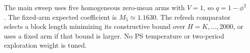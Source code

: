 \documentclass[11pt]{article}
\begin{document}
The main sweep uses five homogeneous zero-mean arms with $V=1$, so $q=1-\phi^2$. The fixed-arm expected coefficient is $M_5\simeq1.1630$. The refresh comparator selects a block length minimizing its constructive bound over $H=K,\ldots,2000$, or uses a fixed arm if that bound is larger. No PS temperature or two-period exploration weight is tuned.

\begin{table}[ht]
\centering
\caption{Measured regret per round against the full-current-state oracle. The lower bound is exact; remaining entries are empirical means and 95\% interval halfwidths.}
\end{table}


\end{document}
